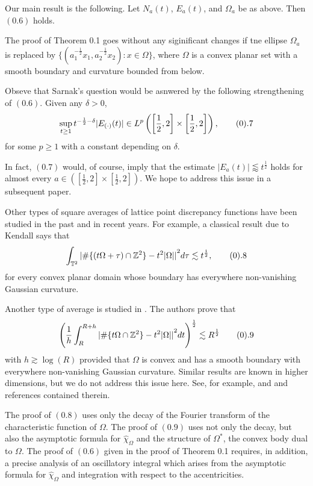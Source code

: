 Our main result is the following.  Let
$N_a(t)$, $E_a(t)$, and $\Omega_a$ be  as above. Then $(0.6)$
holds. \endproclaim 

 The proof of Theorem 0.1 goes  without any siginificant
changes if tne ellipse $\Omega_a$ is replaced by
$\{(a_1^{-\frac{1}{2}}x_1, a_2^{-\frac{1}{2}}x_2): x \in \Omega\}$, where
$\Omega$ is a convex planar set with a smooth boundary and curvature
bounded from below. \endremark  

Obseve that Sarnak's question would be asnwered by the following
strengthening of $(0.6)$. 
  Given any $\delta>0$,
$$ \sup_{t \ge 1} t^{-\frac{1}{2}-\delta}|E_{(\cdot)}(t)| \in L^p
\left(\left[\frac{1}{2},2 \right] \times \left[\frac{1}{2},2 \right]
\right), \tag0.7$$ for some $p \ge 1$ with a constant depending on
$\delta$. 
\endproclaim 

In fact, $(0.7)$ would, of course, imply that the estimate $|E_a(t)|
\lessapprox t^{\frac{1}{2}}$ holds for almost every $a \in 
\left(\left[\frac{1}{2},2 \right] \times \left[\frac{1}{2},2 \right]
\right)$. We hope to address this issue in a subsequent paper. 

Other types of square averages of lattice point discrepancy functions
have been studied in the past and in recent years. For example, a
classical result due to Kendall says that 
$$ \int_{{\Bbb T}^2} {|\# \{(t \Omega +\tau) \cap {\Bbb
Z}^2\}-t^2|\Omega||}^2 d\tau \lesssim t^{\frac{1}{2}}, \tag0.8$$
for every convex planar domain whose boundary has everywhere
non-vanishing Gaussian curvature. 

Another type of average is studied in \cite{ISS02}. The authors prove
that 
$$ {\left( \frac{1}{h} \int_R^{R+h} {|\# \{t \Omega \cap {\Bbb
Z}^2\}-t^2|\Omega||}^2 dt \right)}^{\frac{1}{2}} \lesssim R^{\frac{1}{2}}
\tag0.9$$ with $h \gtrsim \log(R)$ provided that $\Omega$ is convex and
has a smooth boundary with everywhere non-vanishing Gaussian curvature.
Similar results are known in higher dimensions, but we do not address
this issue here. See, for example, \cite{Huxley96} and \cite{ISS02} and
references contained therein. 

The proof of $(0.8)$ uses only the decay of the Fourier transform of the
characteristic function of $\Omega$. The proof of $(0.9)$ uses not only
the decay, but also the asymptotic formula for $\widehat{\chi}_{\Omega}$
and the structure of $\Omega^{*}$, the convex body dual to $\Omega$. The
proof of $(0.6)$ given in the proof of Theorem 0.1 requires, in addition,
a precise analysis of an oscillatory integral which arises from the
asymptotic formula for $\widehat{\chi}_{\Omega}$ and integration with
respect to the accentricities. 

